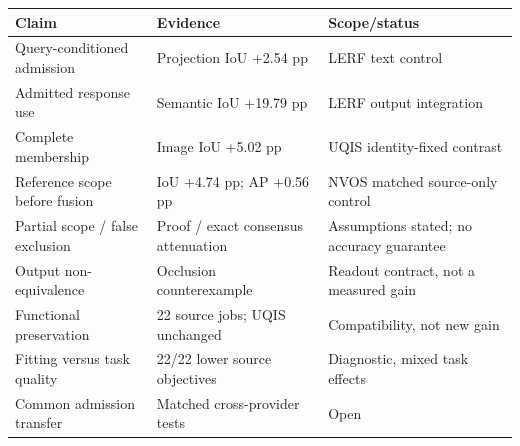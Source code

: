 \begin{tabular}{lll}
\toprule
Claim & Evidence & Scope/status \\
\midrule
Query-conditioned admission & Projection IoU +2.54 pp & LERF text control \\
Admitted response use & Semantic IoU +19.79 pp & LERF output integration \\
Complete membership & Image IoU +5.02 pp & UQIS identity-fixed contrast \\
Reference scope before fusion & IoU +4.74 pp; AP +0.56 pp & NVOS matched source-only control \\
Partial scope / false exclusion & Proof / exact consensus attenuation & Assumptions stated; no accuracy guarantee \\
Output non-equivalence & Occlusion counterexample & Readout contract, not a measured gain \\
Functional preservation & 22 source jobs; UQIS unchanged & Compatibility, not new gain \\
Fitting versus task quality & 22/22 lower source objectives & Diagnostic, mixed task effects \\
Common admission transfer & Matched cross-provider tests & Open \\
\bottomrule
\end{tabular}
